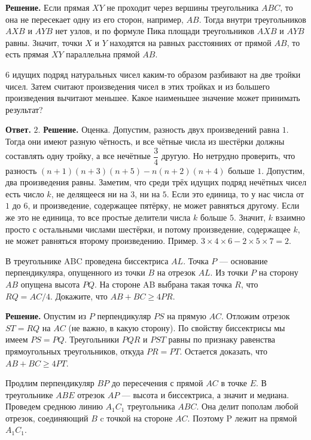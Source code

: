 \textbf{Решение.}  Если прямая $XY$ не проходит через вершины треугольника $ABC$, то она не пересекает одну из его сторон, например, $AB$. Тогда внутри треугольников $AXB$ и $AYB$ нет узлов, и по формуле Пика площади треугольников $AXB$ и $AYB$ равны. Значит, точки $X$ и $Y$ находятся на равных расстояниях от прямой $AB$, то есть прямая $XY$ параллельна прямой $AB$.



6 идущих подряд натуральных чисел каким-то образом разбивают на две тройки чисел. Затем считают произведения чисел в этих тройках и из большего произведения вычитают меньшее. Какое наименьшее значение может принимать результат?

\newpage

\hspace{3mm}

\textbf{Ответ.} $2$. \textbf{Решение.} Оценка. Допустим, разность двух произведений равна $1$. Тогда они имеют разную чётность, и все чётные числа из шестёрки должны составлять одну тройку, а все нечётные $\dfrac{3}{4}$ другую. Но нетрудно проверить, что разность $(n+1)(n+3)(n+5)-n(n+2)(n+4)$ больше $1$. Допустим, два произведения равны. Заметим, что среди трёх идущих подряд нечётных чисел есть число $k$, не делящееся ни на $3$, ни на $5$. Если это единица, то у нас числа от $1$ до $6$, и произведение, содержащее пятёрку, не может равняться другому. Если же это не единица, то все простые делители числа $k$ больше $5$. Значит, $k$ взаимно просто с остальными числами шестёрки, и потому произведение, содержащее $k$, не может равняться второму произведению. Пример. $3\times 4 \times 6 - 2 \times 5 \times 7 = 2.$

В треугольнике ABC проведена биссектриса $AL$. Точка $P$ --- основание перпендикуляра, опущенного из точки $B$ на отрезок $AL$. Из точки $P$ на сторону $AB$ опущена высота $PQ$. На стороне AB выбрана такая точка $R$, что $RQ = AC/4.$ Докажите, что $AB+BC \geq 4PR.$

\noindent\textbf{Решение.} Опустим из $P$ перпендикуляр $PS$ на прямую $AC$. Отложим отрезок $ST = RQ$ на $AC$ (не важно, в какую сторону). По свойству биссектрисы мы имеем $PS = PQ.$ Треугольники $PQR$ и $PST$ равны по признаку равенства прямоугольных треугольников, откуда $PR = PT$. Остается доказать, что $AB+BC \geq 4PT.$

Продлим перпендикуляр $BP$ до пересечения с прямой $AC$ в точке $E$. В треугольнике $ABE$ отрезок $AP$ --- высота и биссектриса, а значит и медиана. Проведем среднюю линию $A_1C_1$ треугольника $ABC$. Она делит пополам любой отрезок, соединяющий $B$ c точкой на стороне $AC$. Поэтому P лежит на прямой $A_1C_1$.

